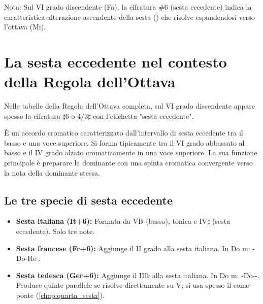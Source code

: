\begin{esempio}
	\label{ex:regola_completa_asc_min}
\end{esempio}

\begin{esempio}
	\label{ex:regola_completa_disc_min}
	Nota: Sul VI grado discendente (Fa), la cifratura \#6 (sesta eccedente) indica la caratteristica alterazione ascendente della sesta (\Rediesis ) che risolve espandendosi verso l'ottava (Mi).
\end{esempio}

\section{La sesta eccedente nel contesto della Regola dell'Ottava}
\label{sec:sesta_eccedente}

Nelle tabelle della Regola dell'Ottava completa, sul VI grado discendente appare spesso la cifratura $\sharp 6$ o $4/3\sharp$ con l'etichetta "sesta eccedente".

\begin{definizione}
    \label{def:sesta_eccedente}
    È un accordo cromatico caratterizzato dall'intervallo di sesta eccedente tra il basso e una voce superiore. Si forma tipicamente tra il VI grado abbassato al basso e il IV grado alzato cromaticamente in una voce superiore.
    La sua funzione principale è preparare la dominante con una spinta cromatica convergente verso la nota della dominante stessa.
\end{definizione}

\subsection{Le tre specie di sesta eccedente}

\begin{itemize}
    \item \textbf{Sesta italiana (It+6):} Formata da VI$\flat$ (basso), tonica e IV$\sharp$ (sesta eccedente). Solo tre note.
    \item \textbf{Sesta francese (Fr+6):} Aggiunge il II grado alla sesta italiana. In Do m: \Labemolle -Do-Re-\Fadiesis .
    \item \textbf{Sesta tedesca (Ger+6):} Aggiunge il III$\flat$ alla sesta italiana. In Do m: \Labemolle -Do-\Mibemolle -\Fadiesis . Produce quinte parallele se risolve direttamente su V; si usa spesso il  come ponte (\ref{chap:quarta_sesta}).
\end{itemize}

